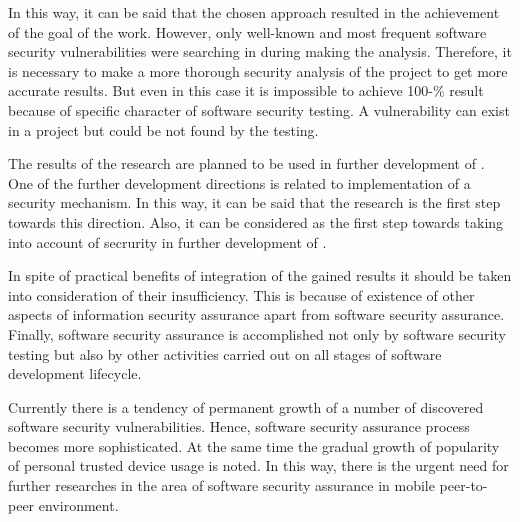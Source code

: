 %
In this way, it can be said that the chosen approach resulted in the achievement of the goal of the work. 
%
However, only well-known and most frequent software security vulnerabilities were searching in  during making the analysis. 
%
Therefore, it is necessary to make a more thorough security analysis of the project to get more accurate results. 
%
But even in this case it is impossible to achieve 100-\% result because of specific character of software security testing. 
%
A vulnerability can exist in a project but could be not found by the testing. 



%
The results of the research are planned to be used in further development of . 
%
One of the further development directions is related to implementation of a security mechanism. 
%
In this way, it can be said that the research is the first step towards this direction. 
%
Also, it can be considered as the first step towards taking into account of secrurity in further development of . 

%
In spite of practical benefits of integration of the gained results it should be taken into consideration of their insufficiency. 
%
This is because of existence of other aspects of information security assurance apart from software security assurance. 
%
Finally, software security assurance is accomplished not only by software security testing but also by other activities carried out on all stages of software development lifecycle. 

%
Currently there is a tendency of permanent growth of a number of discovered software security vulnerabilities. 
%
Hence, software security assurance process becomes more sophisticated. 
%
At the same time the gradual growth of popularity of personal trusted device usage is noted. 
%
In this way, there is the urgent need for further researches in the area of software security assurance in mobile peer-to-peer environment. 